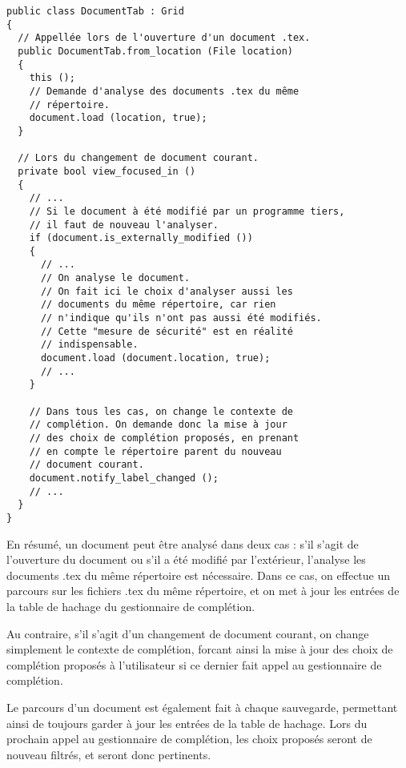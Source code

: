 \documentclass[a4paper,11pt]{report}
\begin{document}
\begin{lstlisting}[frame=single]
public class DocumentTab : Grid
{
  // Appellée lors de l'ouverture d'un document .tex.
  public DocumentTab.from_location (File location)
  {
    this ();
    // Demande d'analyse des documents .tex du même
    // répertoire.
    document.load (location, true);
  }
  
  // Lors du changement de document courant.
  private bool view_focused_in ()
  {
    // ...
    // Si le document à été modifié par un programme tiers,
    // il faut de nouveau l'analyser.
    if (document.is_externally_modified ())
    {
      // ...
      // On analyse le document.
      // On fait ici le choix d'analyser aussi les
      // documents du même répertoire, car rien
      // n'indique qu'ils n'ont pas aussi été modifiés.
      // Cette "mesure de sécurité" est en réalité
      // indispensable.
      document.load (document.location, true);
      // ...
    }

    // Dans tous les cas, on change le contexte de
    // complétion. On demande donc la mise à jour
    // des choix de complétion proposés, en prenant
    // en compte le répertoire parent du nouveau
    // document courant.
    document.notify_label_changed ();
    // ...
  }
}
\end{lstlisting}

En résumé, un document peut être analysé dans deux cas : s'il s'agit de l'ouverture du document ou s'il a été modifié par l'extérieur, l'analyse les documents .tex du même répertoire est nécessaire.
Dans ce cas, on effectue un parcours sur les fichiers .tex du même répertoire, et on met à jour les entrées de la table de hachage du gestionnaire de complétion.

Au contraire, s'il s'agit d'un changement de document courant, on change simplement le contexte de complétion, forcant ainsi la mise à jour des choix de complétion proposés à l'utilisateur si ce dernier fait appel au gestionnaire de complétion.

Le parcours d'un document est également fait à chaque sauvegarde, permettant ainsi de toujours garder à jour les entrées de la table de hachage. Lors du prochain appel au gestionnaire de complétion, les choix proposés seront de nouveau filtrés, et seront donc pertinents.
\end{document}
